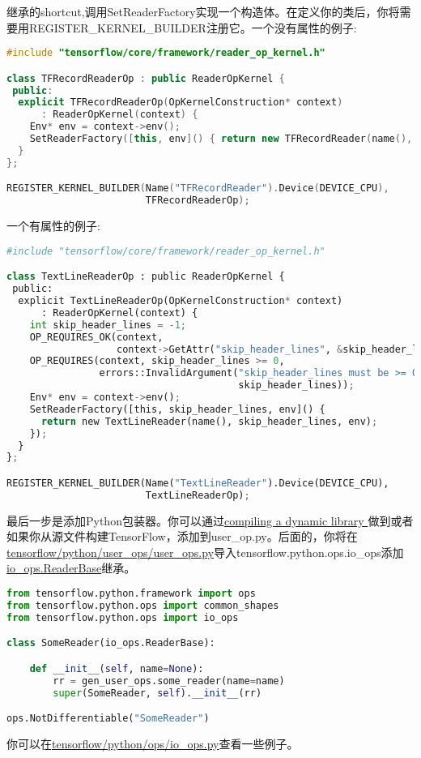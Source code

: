 继承的shortcut,调用SetReaderFactory实现一个构造体。在定义你的类后，你将需要用REGISTER\_KERNEL\_BUILDER注册它。一个没有属性的例子:
\begin{lstlisting}[language=C++]
#include "tensorflow/core/framework/reader_op_kernel.h"

class TFRecordReaderOp : public ReaderOpKernel {
 public:
  explicit TFRecordReaderOp(OpKernelConstruction* context)
      : ReaderOpKernel(context) {
    Env* env = context->env();
    SetReaderFactory([this, env]() { return new TFRecordReader(name(), env); });
  }
};

REGISTER_KERNEL_BUILDER(Name("TFRecordReader").Device(DEVICE_CPU),
                        TFRecordReaderOp);
\end{lstlisting}
一个有属性的例子:
\begin{lstlisting}[language=Python]
#include "tensorflow/core/framework/reader_op_kernel.h"

class TextLineReaderOp : public ReaderOpKernel {
 public:
  explicit TextLineReaderOp(OpKernelConstruction* context)
      : ReaderOpKernel(context) {
    int skip_header_lines = -1;
    OP_REQUIRES_OK(context,
                   context->GetAttr("skip_header_lines", &skip_header_lines));
    OP_REQUIRES(context, skip_header_lines >= 0,
                errors::InvalidArgument("skip_header_lines must be >= 0 not ",
                                        skip_header_lines));
    Env* env = context->env();
    SetReaderFactory([this, skip_header_lines, env]() {
      return new TextLineReader(name(), skip_header_lines, env);
    });
  }
};

REGISTER_KERNEL_BUILDER(Name("TextLineReader").Device(DEVICE_CPU),
                        TextLineReaderOp);
\end{lstlisting}
最后一步是添加Python包装器。你可以通过\href{https://www.tensorflow.org/extend/adding_an_op#building_the_op_library}{compiling a dynamic library }做到或者如果你从源文件构建TensorFlow，添加到user\_op.py。后面的，你将在\href{https://www.github.com/tensorflow/tensorflow/blob/r1.4/tensorflow/python/user_ops/user_ops.py}{tensorflow/python/user\_ops/user\_ops.py}导入tensorflow.python.ops.io\_ops添加\href{https://www.github.com/tensorflow/tensorflow/blob/r1.4/tensorflow/python/ops/io_ops.py}{io\_ops.ReaderBase}继承。
\begin{lstlisting}[language=Python]
from tensorflow.python.framework import ops
from tensorflow.python.ops import common_shapes
from tensorflow.python.ops import io_ops

class SomeReader(io_ops.ReaderBase):

    def __init__(self, name=None):
        rr = gen_user_ops.some_reader(name=name)
        super(SomeReader, self).__init__(rr)

ops.NotDifferentiable("SomeReader")
\end{lstlisting}
你可以在\href{https://www.github.com/tensorflow/tensorflow/blob/r1.4/tensorflow/python/ops/io_ops.py}{tensorflow/python/ops/io\_ops.py}查看一些例子。
